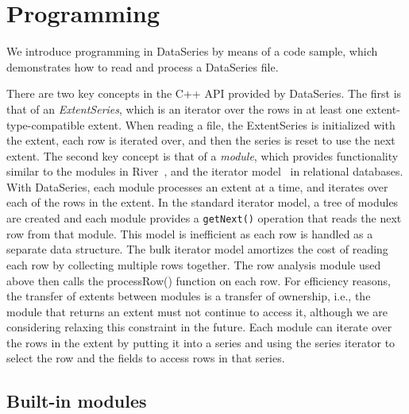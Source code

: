 \section{Programming}\label{sec:programming}

We introduce programming in DataSeries by means of a code sample,
which demonstrates how to read and process a DataSeries file.  

There are two key concepts in the C++ API provided by DataSeries. The
first is that of an \textit{ExtentSeries}, which is an iterator over
the rows in at least one extent-type-compatible extent.  When reading
a file, the ExtentSeries is initialized with the extent, each row is
iterated over, and then the series is reset to use the next extent.
The second key concept is that of a \textit{module}, which provides
functionality similar to the modules in River~\cite{river99}, and the
iterator model~\cite{graefeQueryProcessing93} in relational databases.
With DataSeries, each module processes an extent at a time, and
iterates over each of the rows in the extent.  In the standard
iterator model, a tree of modules are created and each module provides
a {\tt getNext()} operation that reads the next row from that module.
This model is inefficient as each row is handled as a separate data
structure.  The bulk iterator model amortizes the cost of reading each
row by collecting multiple rows together.  The row analysis module
used above then calls the processRow() function on each row.  For
efficiency reasons, the transfer of extents between modules is a
transfer of ownership, i.e., the module that returns an extent must
not continue to access it, although we are considering relaxing this
constraint in the future.  Each module can iterate over the rows in
the extent by putting it into a series and using the series iterator
to select the row and the fields to access rows in that series.

\subsection{Built-in modules}

